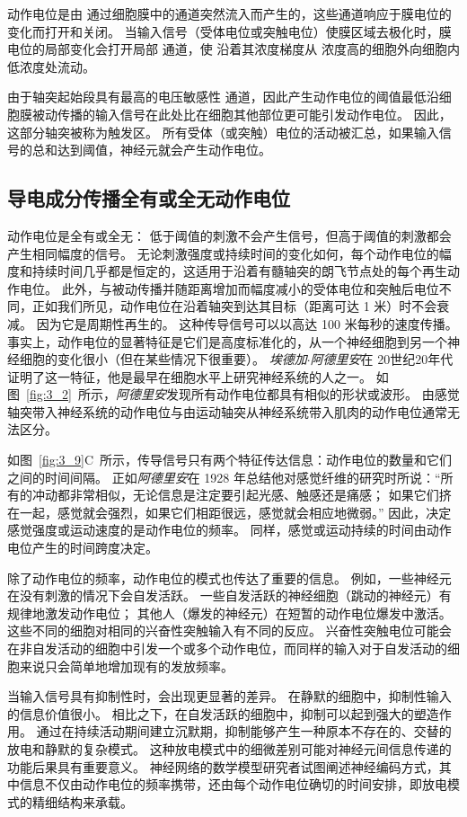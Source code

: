 动作电位是由  通过细胞膜中的通道突然流入而产生的，这些通道响应于膜电位的变化而打开和关闭。 
当输入信号（受体电位或突触电位）使膜区域去极化时，膜电位的局部变化会打开局部  通道，使  沿着其浓度梯度从  浓度高的细胞外向细胞内低浓度处流动。


由于轴突起始段具有最高的电压敏感性 通道，因此产生动作电位的阈值最低沿细胞膜被动传播的输入信号在此处比在细胞其他部位更可能引发动作电位。
因此，这部分轴突被称为触发区。
所有受体（或突触）电位的活动被汇总，如果输入信号的总和达到阈值，神经元就会产生动作电位。


\subsection{导电成分传播全有或全无动作电位}
动作电位是全有或全无：
低于阈值的刺激不会产生信号，但高于阈值的刺激都会产生相同幅度的信号。
无论刺激强度或持续时间的变化如何，每个动作电位的幅度和持续时间几乎都是恒定的，这适用于沿着有髓轴突的朗飞节点处的每个再生动作电位。
此外，与被动传播并随距离增加而幅度减小的受体电位和突触后电位不同，正如我们所见，动作电位在沿着轴突到达其目标（距离可达 1 米）时不会衰减。 
因为它是周期性再生的。
这种传导信号可以以高达 100 米每秒的速度传播。 
事实上，动作电位的显著特征是它们是高度标准化的，从一个神经细胞到另一个神经细胞的变化很小（但在某些情况下很重要）。 
\textit{埃德加$\cdot$阿德里安}在 20世纪20年代证明了这一特征，他是最早在细胞水平上研究神经系统的人之一。
如图~\ref{fig:3_2}~所示，\textit{阿德里安}发现所有动作电位都具有相似的形状或波形。
由感觉轴突带入神经系统的动作电位与由运动轴突从神经系统带入肌肉的动作电位通常无法区分。


如图~\ref{fig:3_9}C~所示，传导信号只有两个特征传达信息：动作电位的数量和它们之间的时间间隔。 
正如\textit{阿德里安}在 1928 年总结他对感觉纤维的研究时所说：“所有的冲动都非常相似，无论信息是注定要引起光感、触感还是痛感；
如果它们挤在一起，感觉就会强烈，如果它们相距很远，感觉就会相应地微弱。” 
因此，决定感觉强度或运动速度的是动作电位的频率。
同样，感觉或运动持续的时间由动作电位产生的时间跨度决定。


除了动作电位的频率，动作电位的模式也传达了重要的信息。
例如，一些神经元在没有刺激的情况下会自发活跃。
一些自发活跃的神经细胞（跳动的神经元）有规律地激发动作电位；
其他人（爆发的神经元）在短暂的动作电位爆发中激活。
这些不同的细胞对相同的兴奋性突触输入有不同的反应。
兴奋性突触电位可能会在非自发活动的细胞中引发一个或多个动作电位，而同样的输入对于自发活动的细胞来说只会简单地增加现有的发放频率。


当输入信号具有抑制性时，会出现更显著的差异。
在静默的细胞中，抑制性输入的信息价值很小。 
相比之下，在自发活跃的细胞中，抑制可以起到强大的塑造作用。
通过在持续活动期间建立沉默期，抑制能够产生一种原本不存在的、交替的放电和静默的复杂模式。
这种放电模式中的细微差别可能对神经元间信息传递的功能后果具有重要意义。
神经网络的数学模型研究者试图阐述神经编码方式，其中信息不仅由动作电位的频率携带，还由每个动作电位确切的时间安排，即放电模式的精细结构来承载。


